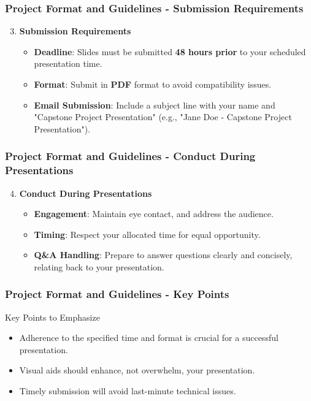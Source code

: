 \documentclass{beamer}
\begin{document}
\begin{frame}[fragile]
    \frametitle{Project Format and Guidelines - Submission Requirements}
    \begin{enumerate}
        \setcounter{enumi}{2}
        \item \textbf{Submission Requirements}
            \begin{itemize}
                \item \textbf{Deadline}: Slides must be submitted \textbf{48 hours prior} to your scheduled presentation time.
                \item \textbf{Format}: Submit in \textbf{PDF} format to avoid compatibility issues.
                \item \textbf{Email Submission}: Include a subject line with your name and "Capstone Project Presentation" (e.g., "Jane Doe - Capstone Project Presentation").
            \end{itemize}
    \end{enumerate}
\end{frame}

\begin{frame}[fragile]
    \frametitle{Project Format and Guidelines - Conduct During Presentations}
    \begin{enumerate}
        \setcounter{enumi}{3}
        \item \textbf{Conduct During Presentations}
            \begin{itemize}
                \item \textbf{Engagement}: Maintain eye contact, and address the audience.
                \item \textbf{Timing}: Respect your allocated time for equal opportunity.
                \item \textbf{Q\&A Handling}: Prepare to answer questions clearly and concisely, relating back to your presentation.
            \end{itemize}
    \end{enumerate}
\end{frame}

\begin{frame}[fragile]
    \frametitle{Project Format and Guidelines - Key Points}
    \begin{block}{Key Points to Emphasize}
        \begin{itemize}
            \item Adherence to the specified time and format is crucial for a successful presentation.
            \item Visual aids should enhance, not overwhelm, your presentation.
            \item Timely submission will avoid last-minute technical issues.
        \end{itemize}
    \end{block}
\end{frame}
\end{document}
